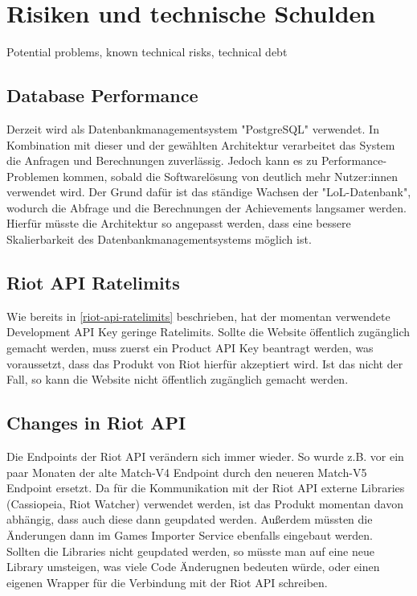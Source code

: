 \section{Risiken und technische Schulden}
Potential problems, known technical risks, technical debt

\subsection{Database Performance}

Derzeit wird als Datenbankmanagementsystem "PostgreSQL" verwendet. In Kombination mit dieser und der gewählten Architektur verarbeitet das System die Anfragen und Berechnungen zuverlässig.
Jedoch kann es zu Performance-Problemen kommen, sobald die Softwarelösung von deutlich mehr Nutzer:innen verwendet wird. Der Grund dafür ist das ständige Wachsen der "LoL-Datenbank", wodurch die Abfrage und
die Berechnungen der Achievements langsamer werden. Hierfür müsste die Architektur so angepasst werden, dass eine bessere Skalierbarkeit des Datenbankmanagementsystems möglich ist.

\subsection{Riot API Ratelimits}
Wie bereits in \ref{riot-api-ratelimits} beschrieben, hat der momentan verwendete Development API Key geringe Ratelimits. Sollte die Website öffentlich zugänglich gemacht werden, muss zuerst ein Product API Key beantragt werden, was voraussetzt, dass das Produkt von Riot hierfür akzeptiert wird. Ist das nicht der Fall, so kann die Website nicht öffentlich zugänglich gemacht werden.

\subsection{Changes in Riot API}
Die Endpoints der Riot API verändern sich immer wieder. So wurde z.B. vor ein paar Monaten der alte Match-V4 Endpoint durch den neueren Match-V5 Endpoint ersetzt. Da für die Kommunikation mit der Riot API externe Libraries (Cassiopeia, Riot Watcher) verwendet werden, ist das Produkt momentan davon abhängig, dass auch diese dann geupdated werden.
Außerdem müssten die Änderungen dann im Games Importer Service ebenfalls eingebaut werden.\\ Sollten die Libraries nicht geupdated werden, so müsste man auf eine neue Library umsteigen, was viele Code Änderugnen bedeuten würde, oder einen eigenen Wrapper für die Verbindung mit der Riot API schreiben.

